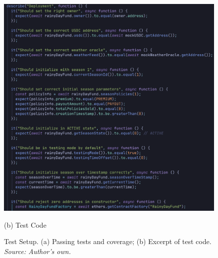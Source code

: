\documentclass[11pt,a4paper]{article}
\begin{document}
\begin{figure}[H]
\begin{minipage}[b]{0.48\textwidth}
            \includegraphics[width=0.95\linewidth]{graphics/Test_Code}
            \caption*{(b) Test Code}
        \end{minipage}
        \caption{Test Setup. (a) Passing tests and coverage; (b) Excerpt of test code. \\ \textit{Source: Author's own.}}
        \label{fig:test-set-up}
    \end{figure}

\end{document}
